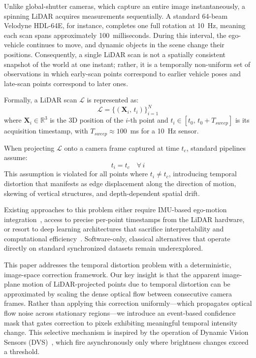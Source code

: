\documentclass[conference]{IEEEtran}
\begin{document}
Unlike global-shutter cameras, which capture an entire image
instantaneously, a spinning LiDAR acquires measurements
sequentially. A standard 64-beam Velodyne HDL-64E, for instance,
completes one full rotation at 10~Hz, meaning each scan spans
approximately 100~milliseconds. During this interval, the ego-vehicle
continues to move, and dynamic objects in the scene change their
positions. Consequently, a single LiDAR scan is not a spatially
consistent snapshot of the world at one instant; rather, it is a
temporally non-uniform set of observations in which early-scan
points correspond to earlier vehicle poses and late-scan points
correspond to later ones.

Formally, a LiDAR scan $\mathcal{L}$ is represented as:
\begin{equation}
  \mathcal{L} = \{ (\mathbf{X}_i,\, t_i) \}_{i=1}^{N}
\end{equation}
where $\mathbf{X}_i \in \mathbb{R}^3$ is the 3D position of the
$i$-th point and $t_i \in [t_0,\, t_0 + T_{sweep}]$ is its
acquisition timestamp, with $T_{sweep} \approx 100$~ms for a 10~Hz
sensor.

When projecting $\mathcal{L}$ onto a camera frame captured at time
$t_c$, standard pipelines assume:
\begin{equation}
  t_i = t_c \quad \forall\, i
\end{equation}
This assumption is violated for all points where $t_i \neq t_c$,
introducing temporal distortion that manifests as edge displacement
along the direction of motion, skewing of vertical structures, and
depth-dependent spatial drift.

Existing approaches to this problem either require IMU-based
ego-motion integration~\cite{kitti}, access to precise per-point
timestamps from the LiDAR hardware, or resort to deep learning
architectures that sacrifice interpretability and computational
efficiency~\cite{delta2025,huang2021}. Software-only, classical
alternatives that operate directly on standard synchronized datasets
remain underexplored.

This paper addresses the temporal distortion problem with a
deterministic, image-space correction framework. Our key insight is
that the apparent image-plane motion of LiDAR-projected points due
to temporal distortion can be approximated by scaling the dense
optical flow between consecutive camera frames. Rather than applying
this correction uniformly---which propagates optical flow noise across
stationary regions---we introduce an event-based confidence mask that
gates correction to pixels exhibiting meaningful temporal intensity
change. This selective mechanism is inspired by the operation of
Dynamic Vision Sensors (DVS)~\cite{gallego2024}, which fire
asynchronously only where brightness changes exceed a threshold.
\end{document}
